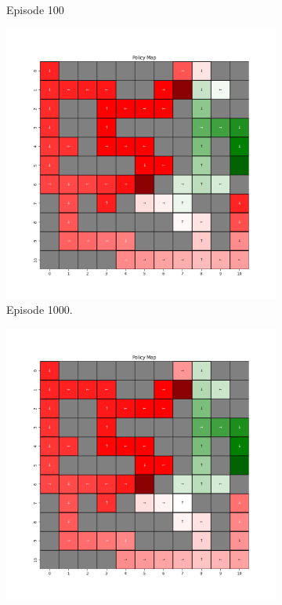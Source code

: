 \documentclass{assignment}
\begin{document}
\begin{figure}[H]
\begin{subfigure}{0.3\textwidth}
    \caption{Episode 100}
    \end{subfigure}
    \begin{subfigure}{0.3\textwidth}
        \includegraphics[width=\textwidth]{figures/policy_q/epsilon_sweep/policy_alpha_0.1_gamma_0.95_epsilon_0.5_iteration_1000.png}
    \caption{Episode 1000.}
    \end{subfigure}\hfill
    \begin{subfigure}{0.3\textwidth}
        \includegraphics[width=\textwidth]{figures/policy_q/epsilon_sweep/policy_alpha_0.1_gamma_0.95_epsilon_0.5_iteration_5000.png}

\end{subfigure}
\end{figure}
\end{document}

